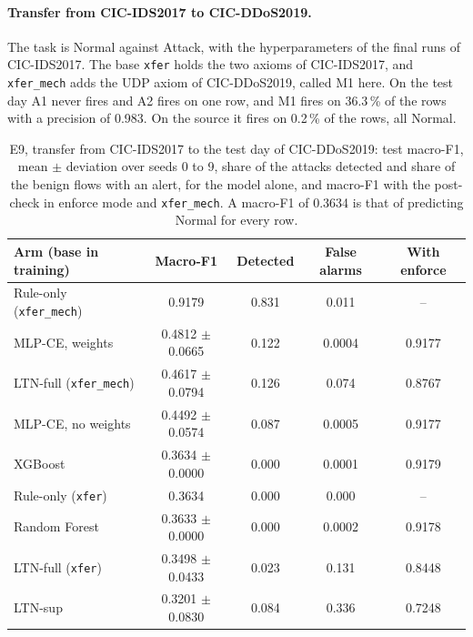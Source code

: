 \paragraph{Transfer from CIC-IDS2017 to CIC-DDoS2019.}
The task is Normal against Attack, with the hyperparameters of the final runs of CIC-IDS2017. The base \texttt{xfer}
holds the two axioms of CIC-IDS2017, and \texttt{xfer\_mech} adds the UDP axiom of CIC-DDoS2019, called M1 here. On
the test day A1 never fires and A2 fires on one row, and M1 fires on 36.3\,\% of the rows with a precision of 0.983. On the source it
fires on 0.2\,\% of the rows, all Normal.

\begin{table}[t]
\centering
\footnotesize
\caption{E9, transfer from CIC-IDS2017 to the test day of CIC-DDoS2019: test macro-F1, mean $\pm$ deviation over
seeds 0 to 9, share of the attacks detected and share of the benign flows with an alert, for the model alone, and
macro-F1 with the post-check in enforce mode and \texttt{xfer\_mech}. A macro-F1 of 0.3634 is that of predicting
Normal for every row.}
\label{tab:res-transfer}
\setlength{\tabcolsep}{4pt}
\begin{tabular}{@{}lcccc@{}}
\toprule
Arm (base in training) & Macro-F1 & Detected & False alarms & With enforce \\
\midrule
Rule-only (\texttt{xfer\_mech}) & 0.9179 & 0.831 & 0.011 & -- \\
MLP-CE, weights      & 0.4812 $\pm$ 0.0665 & 0.122 & 0.0004 & 0.9177 \\
LTN-full (\texttt{xfer\_mech}) & 0.4617 $\pm$ 0.0794 & 0.126 & 0.074 & 0.8767 \\
MLP-CE, no weights   & 0.4492 $\pm$ 0.0574 & 0.087 & 0.0005 & 0.9177 \\
XGBoost              & 0.3634 $\pm$ 0.0000 & 0.000 & 0.0001 & 0.9179 \\
Rule-only (\texttt{xfer}) & 0.3634 & 0.000 & 0.000 & -- \\
Random Forest        & 0.3633 $\pm$ 0.0000 & 0.000 & 0.0002 & 0.9178 \\
LTN-full (\texttt{xfer}) & 0.3498 $\pm$ 0.0433 & 0.023 & 0.131 & 0.8448 \\
LTN-sup              & 0.3201 $\pm$ 0.0830 & 0.084 & 0.336 & 0.7248 \\
\bottomrule
\end{tabular}
\end{table}

